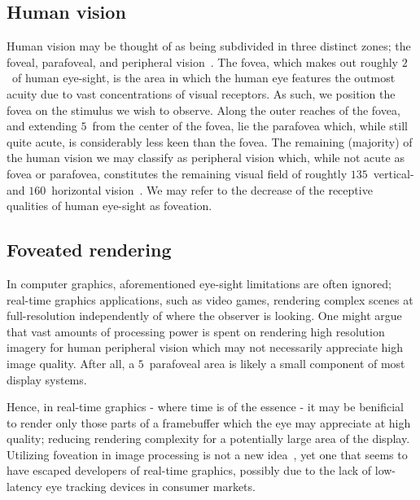 \subsection{Human vision}
Human vision may be thought of as being subdivided in three distinct zones; the foveal, parafoveal, and peripheral vision~\cite{rayner98}.
The fovea, which makes out roughly $2$\degree\ of human eye-sight, is the area in which the human eye features the outmost acuity due to vast concentrations of visual receptors.
As such, we position the fovea on the stimulus we wish to observe.
Along the outer reaches of the fovea, and extending $5$\degree\ from the center of the fovea, lie the parafovea which, while still quite acute, is considerably less keen than the fovea.
The remaining (majority) of the human vision we may classify as peripheral vision which, while not acute as fovea or parafovea, constitutes the remaining visual field of roughtly $135$\degree\ vertical- and $160$\degree\ horizontal vision~\cite{guenter12}.
We may refer to the decrease of the receptive qualities of human eye-sight as foveation.

\subsection{Foveated rendering}
In computer graphics, aforementioned eye-sight limitations are often ignored; real-time graphics applications, such as video games, rendering complex scenes at full-resolution independently of where the observer is looking.
One might argue that vast amounts of processing power is spent on rendering high resolution imagery for human peripheral vision which may not necessarily appreciate high image quality.
After all, a $5$\degree\ parafoveal area is likely a small component of most display systems.

Hence, in real-time graphics - where time is of the essence - it may be benificial to render only those parts of a framebuffer which the eye may appreciate at high quality; reducing rendering complexity for a potentially large area of the display.
Utilizing foveation in image processing is not a new idea~\cite{levoy90}, yet one that seems to have escaped developers of real-time graphics, possibly due to the lack of low-latency eye tracking devices in consumer markets.
